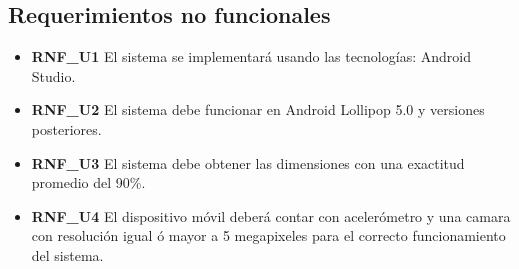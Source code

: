 \subsection{Requerimientos no funcionales}

\begin{itemize}
\item \textbf{RNF\_U1} El sistema se implementará usando las tecnologías: Android Studio.
\item \textbf{RNF\_U2} El sistema debe funcionar en Android Lollipop 5.0 y versiones posteriores.
\item \textbf{RNF\_U3} El sistema debe obtener las dimensiones con una exactitud promedio del 90\%.
\item \textbf{RNF\_U4} El dispositivo móvil deberá contar con acelerómetro y una camara con resolución igual ó mayor a 5 megapixeles para el correcto funcionamiento del sistema.

\end{itemize}